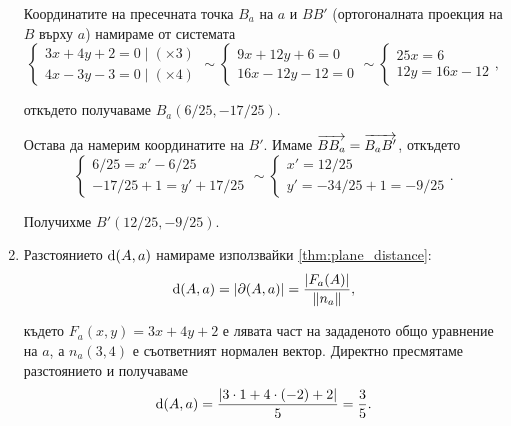 \documentclass[
  numbers=endperiod,
  headings=standardclasses,
  bibliography=totocnumbered,
]{scrartcl}
\begin{document}
\begin{solution}
\begin{enumerate}[label=\alph*)]
    Координатите на пресечната точка \( B_a \) на \( a \) и \( BB' \) (ортогоналната проекция на \( B \) върху \( a \)) намираме от системата
    \begin{equation*}
      \begin{cases}
        3x + 4y + 2 = 0 \mid (\times 3) \\
        4x - 3y - 3 = 0 \mid (\times 4)
      \end{cases}
      \sim
      \begin{cases}
        9x + 12y + 6 = 0 \\
        16x - 12y - 12 = 0
      \end{cases}
      \sim
      \begin{cases}
        25x = 6 \\
        12y = 16x - 12
      \end{cases},
    \end{equation*}

    откъдето получаваме \( B_a(6/25, -17/25) \).

    Остава да намерим координатите на \( B' \). Имаме \( \overrightarrow{BB_a} = \overrightarrow{B_a B'} \), откъдето
    \begin{equation*}
      \begin{cases}
        6/25 = x' - 6/25 \\
        -17/25 + 1 = y' + 17/25
      \end{cases}
      \sim
      \begin{cases}
        x' = 12/25 \\
        y' = -34/25 + 1 = -9/25
      \end{cases}.
    \end{equation*}

    Получихме \( B'(12/25, -9/25) \).

    \item Разстоянието \( \operatorname{d}(A, a) \) намираме използвайки \cref{thm:plane_distance}:
    \begin{equation*}
      \operatorname{d}(A, a) = \left\vert \partial(A, a) \right\vert = \frac {\left\vert F_a(A) \right\vert} {\left\Vert n_a \right\Vert},
    \end{equation*}

    където \( F_a(x, y) = 3x + 4y + 2 \) е лявата част на зададеното общо уравнение на \( a \), а \( n_a(3, 4) \) е съответният нормален вектор. Директно пресмятаме разстоянието и получаваме
    \begin{equation*}
      \operatorname{d}(A, a) = \frac {\left\vert 3 \cdot 1 + 4 \cdot (-2) + 2 \right\vert} 5 = \frac 3 5.
    \end{equation*}


\end{enumerate}
\end{solution}
\end{document}
